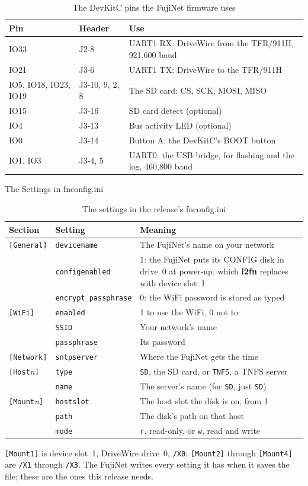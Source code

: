 \documentclass[10pt,twoside,openany]{book}
\makeatletter
\newcommand{\cmd}[1]{\textbf{#1}}            %
\newcommand{\var}[1]{\textit{#1}}            %
\newcommand{\file}[1]{\texttt{#1}}           %
\renewcommand{\section}{\@startsection{section}{1}{0pt}{3.2ex plus 1ex}{1.2ex}%
  {\sffamily\bfseries\large}}
\makeatother
\begin{document}
\begin{table}[H]
\caption{The DevKitC pins the FujiNet firmware uses}\label{tab:fnpins}
\begin{tabularx}{\linewidth}{@{}l l X@{}}
\toprule
\textbf{Pin} & \textbf{Header} & \textbf{Use}\\
\midrule
IO33 & J2-8 & UART1 RX: DriveWire from the TFR/911H, 921{,}600 baud\\
IO21 & J3-6 & UART1 TX: DriveWire to the TFR/911H\\
IO5, IO18, IO23, IO19 & J3-10, 9, 2, 8 & The SD card: CS, SCK, MOSI, MISO\\
IO15 & J3-16 & SD card detect (optional)\\
IO4 & J3-13 & Bus activity LED (optional)\\
IO0 & J3-14 & Button A: the DevKitC's BOOT button\\
IO1, IO3 & J3-4, 5 & UART0: the USB bridge, for flashing and the log, 460{,}800 baud\\
\bottomrule
\end{tabularx}
\end{table}

\section{The Settings in fnconfig.ini}

\begin{table}[H]
\caption{The settings in the release's fnconfig.ini}\label{tab:ini}
\begin{tabularx}{\linewidth}{@{}l l X@{}}
\toprule
\textbf{Section} & \textbf{Setting} & \textbf{Meaning}\\
\midrule
\texttt{[General]} & \texttt{devicename} & The FujiNet's name on your network\\
 & \texttt{configenabled} & 1: the FujiNet puts its CONFIG disk in drive~0 at
 power-up, which \cmd{l2fn} replaces with device slot~1\\
 & \texttt{encrypt\_passphrase} & 0: the WiFi password is stored as typed\\
\texttt{[WiFi]} & \texttt{enabled} & 1 to use the WiFi, 0 not to\\
 & \texttt{SSID} & Your network's name\\
 & \texttt{passphrase} & Its password\\
\texttt{[Network]} & \texttt{sntpserver} & Where the FujiNet gets the time\\
\texttt{[Host}\var{n}\texttt{]} & \texttt{type} & \texttt{SD}, the SD card, or
\texttt{TNFS}, a TNFS server\\
 & \texttt{name} & The server's name (for \texttt{SD}, just \texttt{SD})\\
\texttt{[Mount}\var{n}\texttt{]} & \texttt{hostslot} & The host slot the disk is
on, from 1\\
 & \texttt{path} & The disk's path on that host\\
 & \texttt{mode} & \texttt{r}, read-only, or \texttt{w}, read and write\\
\bottomrule
\end{tabularx}
\end{table}

\texttt{[Mount1]} is device slot~1, DriveWire drive~0, \file{/X0};
\texttt{[Mount2]} through \texttt{[Mount4]} are \file{/X1} through
\file{/X3}. The FujiNet writes every setting it has when it saves the
file; these are the ones this release needs.
\end{document}
